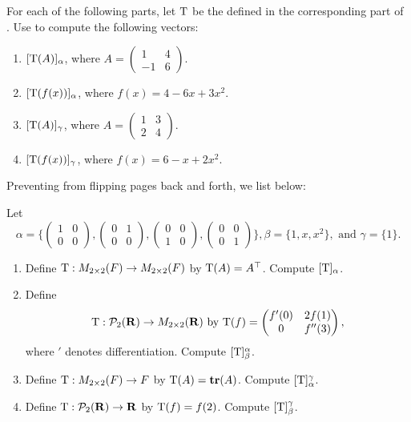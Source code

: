 \begin{exercise} \label{exercise 2.3.4}
For each of the following parts, let \(\mathrm{T}\) be the \LTRAN{} defined in the corresponding part of .
Use  to compute the following vectors:

\begin{enumerate}
\item \([\mathrm{T}(A)]_{\alpha}\), where \(A = \begin{pmatrix} 1 & 4 \\ -1 & 6 \end{pmatrix}\).
\item \([\mathrm{T}(f(x))]_{\alpha}\), where \(f(x) = 4 - 6x + 3x^2\).
\item \([\mathrm{T}(A)]_{\gamma}\), where \(A = \begin{pmatrix} 1 & 3 \\ 2 & 4 \end{pmatrix}\).
\item \([\mathrm{T}(f(x))]_{\gamma}\), where \(f(x) = 6 - x + 2x^2\).
\end{enumerate}

\end{exercise}

\begin{note}
Preventing from flipping pages back and forth, we list  below:

Let
\[
    \alpha = \bigg\{
                \begin{pmatrix} 1 & 0 \\ 0 & 0 \end{pmatrix},
                \begin{pmatrix} 0 & 1 \\ 0 & 0 \end{pmatrix},
                \begin{pmatrix} 0 & 0 \\ 1 & 0 \end{pmatrix},
                \begin{pmatrix} 0 & 0 \\ 0 & 1 \end{pmatrix}
            \bigg\},
    \beta = \{ 1, x, x^{2} \},
    \text { and }
    \gamma = \{ 1 \}.
\]
\begin{enumerate}
\item Define \(\mathrm{T} : M_{2 \times 2}(F) \to M_{2 \times 2}(F)\) by \(\mathrm{T}(A) = A^\top\).
Compute \([\mathrm{T}]_{\alpha}\).
\item Define
\[
    \mathrm{T}: \mathcal{P}_2(\mathbf{R}) \to M_{2 \times 2}(\mathbf{R}) \text{ by }
    \mathrm{T}(f) = \begin{pmatrix} f'(0) & 2f(1) \\ 0 & f''(3) \end{pmatrix},
\]
where \('\) denotes differentiation.
Compute \([\mathrm{T}]_{\beta}^{\alpha}\).
\item Define \(\mathrm{T}: M_{2 \times 2}(F) \to F\) by \(\mathrm{T}(A) = \textbf{tr}(A)\).
Compute \([\mathrm{T}]_{\alpha}^{\gamma}\).
\item Define \(\mathrm{T}: \mathcal{P}_2(\mathbf{R}) \to \mathbf{R}\) by \(\mathrm{T}(f) = f(2)\). 
Compute \([\mathrm{T}]_{\beta}^{\gamma}\).
\end{enumerate}
\end{note}

